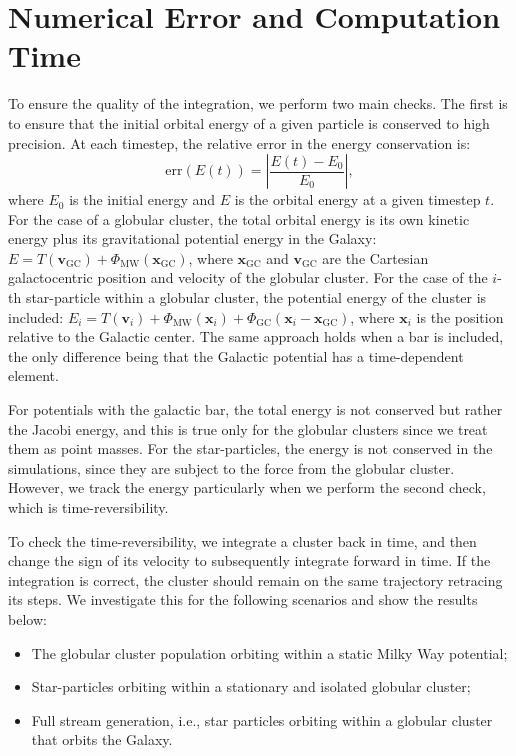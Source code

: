 \section{Numerical Error and Computation Time}
    To ensure the quality of the integration, we perform two main checks. The first is to ensure that the initial orbital energy of a given particle is conserved to high precision. At each timestep, the relative error in the energy conservation is:
    \begin{equation} 
        \mathrm{err}(E(t)) = \left|\frac{E(t) - E_0}{E_0}\right|,
    \end{equation} 
    where $E_0$ is the initial energy and $E$ is the orbital energy at a given timestep $t$. For the case of a globular cluster, the total orbital energy is its own kinetic energy plus its gravitational potential energy in the Galaxy: $E = T(\mathbf{v}_{\mathrm{GC}}) + \Phi_{\mathrm{MW}}\left(\mathbf{x}_{\mathrm{GC}}\right)$, where $\mathbf{x}_{\mathrm{GC}}$ and $\mathbf{v}_{\mathrm{GC}}$ are the Cartesian galactocentric position and velocity of the globular cluster. For the case of the $i$-th star-particle within a globular cluster, the potential energy of the cluster is included: $E_i = T(\textbf{v}_i) + \Phi_{\mathrm{MW}}\left(\textbf{x}_i\right) + \Phi_\mathrm{GC}\left(\textbf{x}_i - \textbf{x}_{\mathrm{GC}}\right)$, where $\mathbf{x}_i$ is the position relative to the Galactic center. The same approach holds when a bar is included, the only difference being that the Galactic potential has a time-dependent element. 

    For potentials with the galactic bar, the total energy is not conserved but rather the Jacobi energy, and this is true only for the globular clusters since we treat them as point masses. For the star-particles, the energy is not conserved in the simulations, since they are subject to the force from the globular cluster. However, we track the energy particularly when we perform the second check, which is time-reversibility.

    To check the time-reversibility, we integrate a cluster back in time, and then change the sign of its velocity to subsequently integrate forward in time. If the integration is correct, the cluster should remain on the same trajectory retracing its steps. We investigate this for the following scenarios and show the results below: 
    \begin{itemize}
        \item The globular cluster population orbiting within a static Milky Way potential;
        \item Star-particles orbiting within a stationary and isolated globular cluster;
        \item Full stream generation, i.e., star particles orbiting within a globular cluster that orbits the Galaxy.
    \end{itemize}

